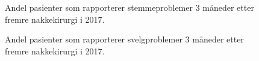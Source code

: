\begin{figure}[ht]
\caption{\label{fig:NakkeStemme3mndSh} Andel pasienter som rapporterer stemmeproblemer 3 måneder etter fremre nakkekirurgi i 2017.}
\end{figure}

\begin{figure}[ht]
\caption{\label{fig:NakkeSvelg3mndSh} Andel pasienter som rapporterer svelgproblemer 3 måneder etter fremre nakkekirurgi i 2017.}
\end{figure}







      
      
 


